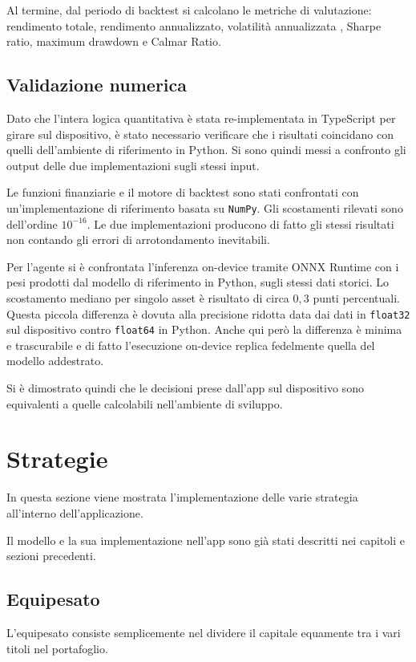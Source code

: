 Al termine, dal periodo di backtest si calcolano le metriche di
valutazione: rendimento totale, rendimento annualizzato, volatilità annualizzata
, Sharpe ratio, maximum drawdown e Calmar Ratio.

\subsection{Validazione numerica}
\label{subsec:validazione}



Dato che l'intera logica quantitativa è stata re-implementata in TypeScript per
girare sul dispositivo, è stato necessario verificare che i risultati coincidano
con quelli dell'ambiente di riferimento in Python. 
Si sono quindi messi a confronto gli output delle due implementazioni sugli stessi input.

Le funzioni finanziarie e il motore di backtest sono stati confrontati con un'implementazione di riferimento basata su \lstinline{NumPy}. 
Gli scostamenti rilevati sono dell'ordine $10^{-16}$.
Le due implementazioni producono di fatto gli stessi risultati non contando gli errori di arrotondamento inevitabili. 

Per l'agente si è confrontata l'inferenza on-device tramite ONNX Runtime con i pesi
prodotti dal modello di riferimento in Python, sugli stessi dati storici.
Lo scostamento mediano per singolo asset è risultato di circa $0{,}3$ punti percentuali. 
Questa piccola differenza è dovuta alla precisione ridotta data dai dati in \lstinline{float32} sul dispositivo contro \lstinline{float64} in Python.
Anche qui però la differenza è minima e trascurabile e di fatto l'esecuzione on-device replica fedelmente quella del modello addestrato.

Si è dimostrato quindi che le decisioni prese dall'app sul dispositivo sono equivalenti a quelle calcolabili nell'ambiente
di sviluppo.


\section{Strategie}
\label{set:strategie}

In questa sezione viene mostrata l'implementazione delle varie strategia all'interno dell'applicazione.

Il modello e la sua implementazione nell'app sono già stati descritti nei capitoli e sezioni precedenti.

\subsection{Equipesato}
L'equipesato consiste semplicemente nel dividere il capitale equamente tra i vari titoli nel portafoglio.

